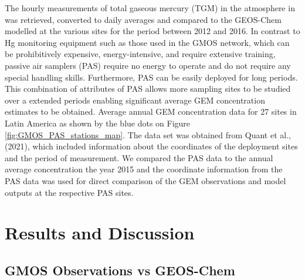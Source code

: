 \begin{flushleft}
The hourly measurements of total gaseous mercury (TGM) in the atmosphere in \nang was retrieved, converted to daily averages and compared to the GEOS-Chem modelled \hg at the various sites for the period between 2012 and 2016. In contrast to Hg monitoring equipment such as those used in the GMOS network, which can be prohibitively expensive, energy-intensive, and require extensive training, passive air samplers (PAS) require no energy to operate and do not require any special handling skills. Furthermore, PAS can be easily deployed for long periods. This combination of attributes of PAS allows more sampling sites to be studied over a extended periods enabling significant average GEM concentration estimates to be obtained. Average annual GEM concentration data for 27 sites in Latin America as shown by the blue dots on Figure  \ref{fig:GMOS_PAS_stations_map}. The data set was obtained from Quant et al., (2021), which included information about the coordinates of the deployment sites and the period of measurement. We compared the PAS data to the annual average concentration the year 2015 and the coordinate information from the PAS data was used for direct comparison of the GEM observations and model outputs at the respective PAS sites.
\end{flushleft}


\section{Results and Discussion}
\subsection{GMOS Observations vs GEOS-Chem}


